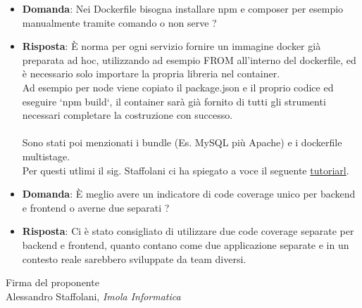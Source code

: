 \documentclass[a4paper, 11pt]{article}
\begin{document}
\begin{itemize}
\item \textbf{Domanda}: Nei Dockerfile bisogna installare npm e composer per esempio manualmente tramite comando o non serve ?%
\item \textbf{Risposta}: È norma per ogni servizio fornire un immagine docker già preparata ad hoc, utilizzando ad esempio FROM all'interno del dockerfile, ed è necessario solo importare la propria libreria nel container. \\ Ad esempio per node viene copiato il package.json e il proprio codice ed eseguire `npm build`, il container sarà già fornito di tutti gli strumenti necessari completare la costruzione con successo. \\ \\ Sono stati poi menzionati i bundle (Es. MySQL più Apache) e i dockerfile multistage. \\ Per questi utlimi il sig. Staffolani ci ha spiegato a voce il seguente \href{https://medium.com/@mohamedbenkhemiswork576/how-to-dockerize-a-react-app-with-multi-stage-build-and-nginx-minimize-react-image-size-by-80-33a09ae20118}{tutoriarl}.
\end{itemize}

\begin{itemize}
\item \textbf{Domanda}: È meglio avere un indicatore di code coverage unico per backend e frontend o averne due separati ?%
\item \textbf{Risposta}: Ci è stato consigliato di utilizzare due code coverage separate per backend e frontend, quanto contano come due applicazione separate e in un contesto reale sarebbero sviluppate da team diversi.
\end{itemize}

\vspace{60pt}
\begin{flushleft}
\hfill Firma del proponente \\
\vspace{50pt}
\hfill Alessandro Staffolani, \textit{Imola Informatica}
\end{flushleft}
\end{document}
